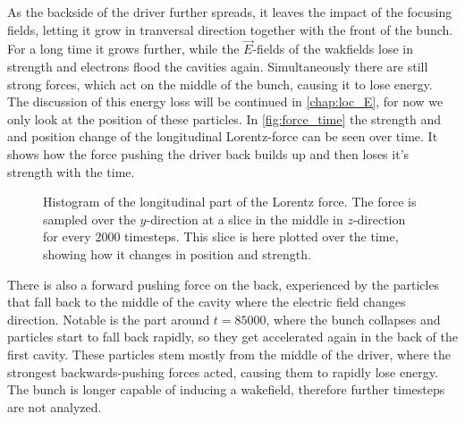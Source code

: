\documentclass[bachelor_thesis]{subfiles}
\begin{document}
As the backside of the driver further spreads, it leaves the impact of the focusing fields, letting it grow in tranversal direction together with the front of the bunch. For a long time it grows further, while the $\vec{E}$-fields of the wakfields lose in strength and electrons flood the cavities again.
Simultaneously there are still strong forces, which act on the middle of the bunch, causing it to lose energy. The discussion of this energy loss will be continued in \autoref{chap:loc_E}, for now we only look at the position of these particles.
In \autoref{fig:force_time} the strength and and position change of the longitudinal Lorentz-force can be seen over time. It shows how the force pushing the driver back builds up and then loses it's strength with the time.
\begin{figure}
	\centering
	\missingfigure{}
	\caption{Histogram of the longitudinal part of the Lorentz force. The force is sampled over the $y$-direction at a slice in the middle in $z$-direction for every 2000 timesteps. This slice is here plotted over the time, showing how it changes in position and strength.}
	\label{fig:force_time}
\end{figure}
There is also a forward pushing force on the back, experienced by the particles that fall back to the middle of the cavity where the electric field changes direction. Notable is the part around $t=85000$, where the bunch collapses and particles start to fall back rapidly,
so they get accelerated again in the back of the first cavity. These particles stem mostly from the middle of the driver, where the strongest backwards-pushing forces acted, causing them to rapidly lose energy.
The bunch is longer capable of inducing a wakefield, therefore further timesteps are not analyzed.
\end{document}
